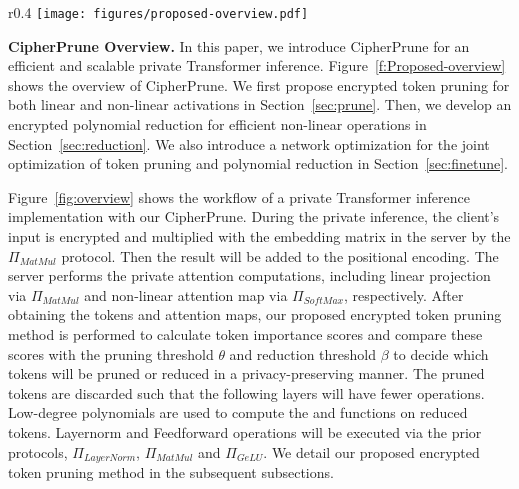 \begin{wrapfigure}{r}{0.4\textwidth}  %
  \centering
  \vspace{-0.2in}
  \texttt{[image: figures/proposed-overview.pdf]}
  \caption{Overview of CipherPrune.}
  \vspace{-0.18in}
  \label{f:Proposed-overview}
\end{wrapfigure}


\noindent\textbf{CipherPrune Overview.} In this paper, we introduce CipherPrune for an efficient and scalable private Transformer inference. Figure~\ref{f:Proposed-overview} shows the overview of CipherPrune. We first propose encrypted token pruning for both linear and non-linear activations in Section~\ref{sec:prune}. Then, we develop an encrypted polynomial reduction for efficient non-linear operations in Section~\ref{sec:reduction}. We also introduce a network optimization for the joint optimization of token pruning and polynomial reduction in Section~\ref{sec:finetune}. 

Figure~\ref{fig:overview} shows the workflow of a private Transformer inference implementation with our CipherPrune. During the private inference,  the client's input is encrypted and multiplied with the embedding matrix in the server by the $\Pi_{MatMul}$ protocol. Then the result will be added to the positional encoding.  The server performs the private attention computations, including linear projection via $\Pi_{MatMul}$ and non-linear attention map via $\Pi_{SoftMax}$, respectively. After obtaining the tokens and attention maps,  our proposed encrypted token pruning method is performed to calculate token importance scores and compare these scores with the pruning threshold $\theta$ and reduction threshold $\beta$ to decide which tokens will be pruned or reduced in a privacy-preserving manner. The pruned tokens are discarded such that the following layers will have fewer operations. Low-degree polynomials are used to compute the \gelu and \mysoftmax functions on reduced tokens.  Layernorm and Feedforward operations will be executed via the prior protocols, $\Pi_{LayerNorm}$, $\Pi_{MatMul}$ and $\Pi_{GeLU}$. We detail our proposed encrypted token pruning method in the subsequent subsections.

